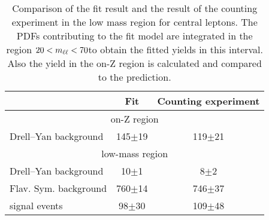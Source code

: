 
\begin{table}[hbtp]
 \renewcommand{\arraystretch}{1.3}
 \setlength{\belowcaptionskip}{6pt}
 \centering
 \caption{Comparison of the fit result and the result of the counting experiment in the low mass region for central leptons. The PDFs contributing to the fit model are integrated in the region $20 < m_{\ell\ell} < 70$\GeV to obtain the fitted yields in this interval. Also the yield in the on-Z region is calculated and compared to the prediction. 
     }
  \label{tab:fitResultLowMass}
  \begin{tabular}{l| cc }
    \hline
    \hline
                                &  Fit        & Counting experiment \\ 

    \hline
    \multicolumn{3}{c}{on-Z region} \\ 

    \hline
        Drell--Yan background       &  145$\pm$19                   & 119$\pm$21  \\

\hline
    \multicolumn{3}{c}{low-mass region} \\ 

    \hline
        Drell--Yan background       &  10$\pm$1                   & 8$\pm$2  \\
        Flav. Sym. background       &  760$\pm$14                   & 746$\pm$37  \\
        signal events       &  98$\pm$30                   & 109$\pm$48  \\

    \hline
    \hline    
  \end{tabular}
\end{table}


